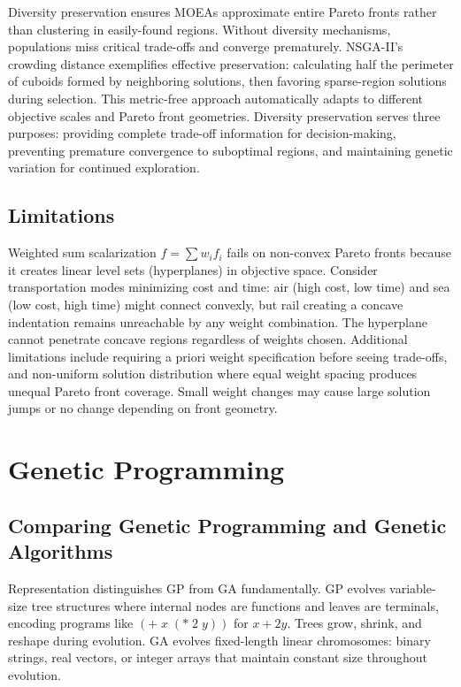 \documentclass[journal,12pt,onecolumn]{IEEEtran}
\begin{document}
Diversity preservation ensures MOEAs approximate entire Pareto fronts rather than clustering in easily-found regions. Without diversity mechanisms, populations miss critical trade-offs and converge prematurely. NSGA-II's crowding distance exemplifies effective preservation: calculating half the perimeter of cuboids formed by neighboring solutions, then favoring sparse-region solutions during selection. This metric-free approach automatically adapts to different objective scales and Pareto front geometries. Diversity preservation serves three purposes: providing complete trade-off information for decision-making, preventing premature convergence to suboptimal regions, and maintaining genetic variation for continued exploration.

\subsection{Limitations}

Weighted sum scalarization $f = \sum w_i f_i$ fails on non-convex Pareto fronts because it creates linear level sets (hyperplanes) in objective space. Consider transportation modes minimizing cost and time: air (high cost, low time) and sea (low cost, high time) might connect convexly, but rail creating a concave indentation remains unreachable by any weight combination. The hyperplane cannot penetrate concave regions regardless of weights chosen. Additional limitations include requiring a priori weight specification before seeing trade-offs, and non-uniform solution distribution where equal weight spacing produces unequal Pareto front coverage. Small weight changes may cause large solution jumps or no change depending on front geometry.

\section{Genetic Programming}

\subsection{Comparing Genetic Programming and Genetic Algorithms}

Representation distinguishes GP from GA fundamentally. GP evolves variable-size tree structures where internal nodes are functions and leaves are terminals, encoding programs like $(+ \; x \; (* \; 2 \; y))$ for $x + 2y$. Trees grow, shrink, and reshape during evolution. GA evolves fixed-length linear chromosomes: binary strings, real vectors, or integer arrays that maintain constant size throughout evolution.
\end{document}
